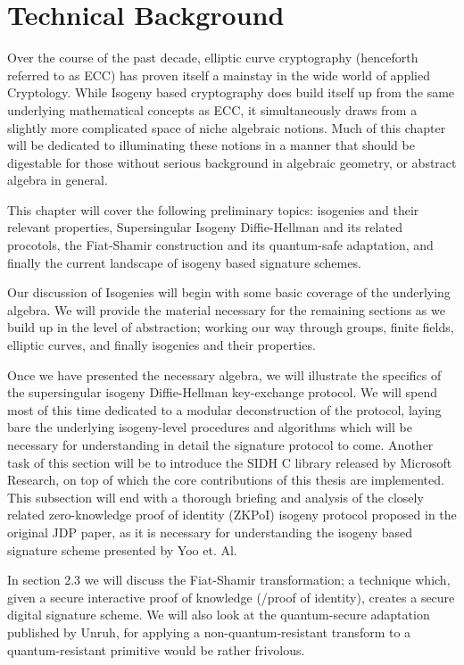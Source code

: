 \chapter{Technical Background}

Over the course of the past decade, elliptic curve cryptography (henceforth referred to as ECC) has proven itself a mainstay in the wide world of applied Cryptology. While Isogeny based cryptography does build itself up from the same underlying mathematical concepts as ECC, it simultaneously draws from a slightly more complicated space of niche algebraic notions. Much of this chapter will be dedicated to illuminating these notions in a manner that should be digestable for those without serious background in algebraic geometry, or abstract algebra in general.

This chapter will cover the following preliminary topics: isogenies and their relevant properties, Supersingular Isogeny Diffie-Hellman and its related procotols, the Fiat-Shamir construction and its quantum-safe adaptation, and finally the current landscape of isogeny based signature schemes.

Our discussion of Isogenies will begin with some basic coverage of the underlying algebra. We will provide the material necessary for the remaining sections as we build up in the level of abstraction; working our way through groups, finite fields, elliptic curves, and finally isogenies and their properties.

Once we have presented the necessary algebra, we will illustrate the specifics of the supersingular isogeny Diffie-Hellman key-exchange protocol. We will spend most of this time dedicated to a modular deconstruction of the protocol, laying bare the underlying isogeny-level procedures and algorithms which will be necessary for understanding in detail the signature protocol to come. Another task of this section will be to introduce the SIDH C library released by Microsoft Research, on top of which the core contributions of this thesis are implemented. This subsection will end with a thorough briefing and analysis of the closely related zero-knowledge proof of identity (ZKPoI) isogeny protocol proposed in the original JDP paper, as it is necessary for understanding the isogeny based signature scheme presented by Yoo et. Al.

In section 2.3 we will discuss the Fiat-Shamir transformation; a technique which, given a secure interactive proof of knowledge (/proof of identity), creates a secure digital signature scheme. We will also look at the quantum-secure adaptation published by Unruh, for applying a non-quantum-resistant transform to a quantum-resistant primitive would be rather frivolous.

